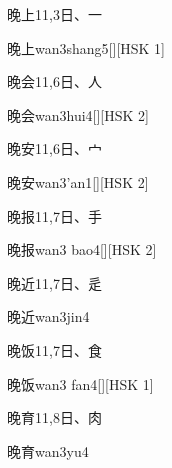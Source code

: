 \begin{entry}{晚上}{11,3}{⽇、⼀}
  \begin{phonetics}{晚上}{wan3shang5}[][HSK 1]
  \end{phonetics}
\end{entry}

\begin{entry}{晚会}{11,6}{⽇、⼈}
  \begin{phonetics}{晚会}{wan3hui4}[][HSK 2]
  \end{phonetics}
\end{entry}

\begin{entry}{晚安}{11,6}{⽇、⼧}
  \begin{phonetics}{晚安}{wan3'an1}[][HSK 2]
  \end{phonetics}
\end{entry}

\begin{entry}{晚报}{11,7}{⽇、⼿}
  \begin{phonetics}{晚报}{wan3 bao4}[][HSK 2]
  \end{phonetics}
\end{entry}

\begin{entry}{晚近}{11,7}{⽇、⾡}
  \begin{phonetics}{晚近}{wan3jin4}
  \end{phonetics}
\end{entry}

\begin{entry}{晚饭}{11,7}{⽇、⾷}
  \begin{phonetics}{晚饭}{wan3 fan4}[][HSK 1]
  \end{phonetics}
\end{entry}

\begin{entry}{晚育}{11,8}{⽇、⾁}
  \begin{phonetics}{晚育}{wan3yu4}
  \end{phonetics}
\end{entry}


